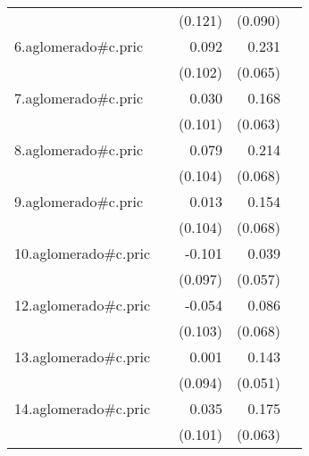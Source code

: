 {\begin{longtable}{l*{4}{D{.}{.}{-1}}}
            &                     &     (0.121)         &     (0.090)         &                     \\
\addlinespace
6.aglomerado#c.pric&                     &       0.092         &       0.231\sym{***}&                     \\
            &                     &     (0.102)         &     (0.065)         &                     \\
\addlinespace
7.aglomerado#c.pric&                     &       0.030         &       0.168\sym{**} &                     \\
            &                     &     (0.101)         &     (0.063)         &                     \\
\addlinespace
8.aglomerado#c.pric&                     &       0.079         &       0.214\sym{**} &                     \\
            &                     &     (0.104)         &     (0.068)         &                     \\
\addlinespace
9.aglomerado#c.pric&                     &       0.013         &       0.154\sym{*}  &                     \\
            &                     &     (0.104)         &     (0.068)         &                     \\
\addlinespace
10.aglomerado#c.pric&                     &      -0.101         &       0.039         &                     \\
            &                     &     (0.097)         &     (0.057)         &                     \\
\addlinespace
12.aglomerado#c.pric&                     &      -0.054         &       0.086         &                     \\
            &                     &     (0.103)         &     (0.068)         &                     \\
\addlinespace
13.aglomerado#c.pric&                     &       0.001         &       0.143\sym{**} &                     \\
            &                     &     (0.094)         &     (0.051)         &                     \\
\addlinespace
14.aglomerado#c.pric&                     &       0.035         &       0.175\sym{**} &                     \\
            &                     &     (0.101)         &     (0.063)         &                     \\

\end{longtable}}
